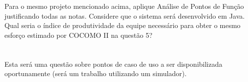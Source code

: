 \documentclass[10pt,a5paper]{report}
\begin{document}
\section{}
\qquad Para o mesmo projeto mencionado acima, aplique Análise de Pontos de Função
justificando todas as notas. Considere que o sistema será desenvolvido em Java.
Qual seria o índice de produtividade da equipe necessário para obter o mesmo
esforço estimado por COCOMO II na questão 5?

\section{}
\qquad Esta será uma questão sobre pontos de caso de uso a ser disponibilizada
oportunamente (será um trabalho utilizando um simulador).
\end{document}
